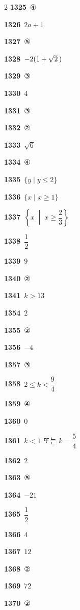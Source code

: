 \documentclass[10pt,a4paper]{article}
\begin{document}
\begin{multicols}{2}
\noindent\textbf{1325}\ ④\par
\noindent\textbf{1326}\ $2a+1$\par
\noindent\textbf{1327}\ ⑤\par
\noindent\textbf{1328}\ $-2(1+\sqrt{2}\mkern3mu )$\par
\noindent\textbf{1329}\ ③\par
\noindent\textbf{1330}\ $4$\par
\noindent\textbf{1331}\ ③\par
\noindent\textbf{1332}\ ②\par
\noindent\textbf{1333}\ $\sqrt{6}$\par
\noindent\textbf{1334}\ ④\par
\noindent\textbf{1335}\ $\{y \mid y\le 2\}$\par
\noindent\textbf{1336}\ $\{x \mid x\ge 1\}$\par
\noindent\textbf{1337}\ $\left\{x \;\middle|\; x\ge \dfrac{2}{3}\right\}$\par
\noindent\textbf{1338}\ $\dfrac{1}{2}$\par
\noindent\textbf{1339}\ $9$\par
\noindent\textbf{1340}\ ②\par
\noindent\textbf{1341}\ $k>13$\par
\noindent\textbf{1354}\ $2$\par
\noindent\textbf{1355}\ ②\par
\noindent\textbf{1356}\ $-4$\par
\noindent\textbf{1357}\ ③\par
\noindent\textbf{1358}\ $2\le k<\dfrac{9}{4}$\par
\noindent\textbf{1359}\ ④\par
\noindent\textbf{1360}\ $0$\par
\noindent\textbf{1361}\ $k<1$ 또는 $k=\dfrac{5}{4}$\par
\noindent\textbf{1362}\ $2$\par
\noindent\textbf{1363}\ ⑤\par
\noindent\textbf{1364}\ $-21$\par
\noindent\textbf{1365}\ $\dfrac{1}{2}$\par
\noindent\textbf{1366}\ $4$\par
\noindent\textbf{1367}\ $12$\par
\noindent\textbf{1368}\ ②\par
\noindent\textbf{1369}\ $72$\par
\noindent\textbf{1370}\ ②\par

\end{multicols}
\end{document}
